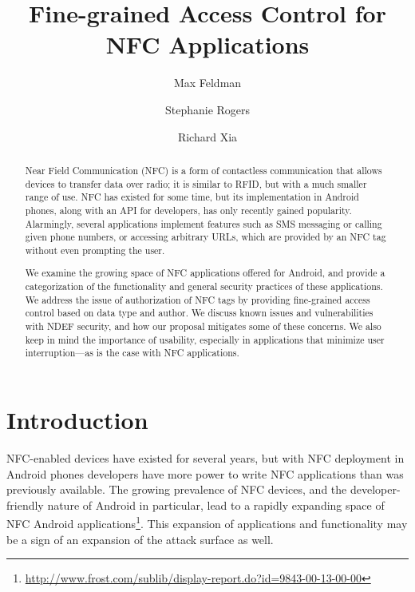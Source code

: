 \documentclass[12pt]{article}
\begin{document}
\title{Fine-grained Access Control for NFC Applications}
\author{Max Feldman \and Stephanie Rogers \and Richard Xia}
\maketitle

\begin{abstract}
Near Field Communication (NFC) is a form of contactless communication that allows devices to transfer data over radio; it is similar to RFID, but with a much smaller range of use.
NFC has existed for some time, but its implementation in Android phones, along with an API for developers, has only recently gained popularity.
Alarmingly, several applications implement features such as SMS messaging or calling given phone numbers, or accessing arbitrary URLs, which are provided by an NFC tag without even prompting the user.

We examine the growing space of NFC applications offered for Android, and provide a categorization of the functionality and general security practices of these applications.
We address the issue of authorization of NFC tags by providing fine-grained access control based on data type and author.
We discuss known issues and vulnerabilities with NDEF security, and how our proposal mitigates some of these concerns.
We also keep in mind the importance of usability, especially in applications that minimize user interruption---as is the case with NFC applications.
\end{abstract}


\section{Introduction}
NFC-enabled devices have existed for several years, but with NFC deployment in Android phones developers have more power to write NFC applications than was previously available.
The growing prevalence of NFC devices, and the developer-friendly nature of Android in particular, lead to a rapidly expanding space of NFC Android applications\footnote{\url{http://www.frost.com/sublib/display-report.do?id=9843-00-13-00-00}}.
This expansion of applications and functionality may be a sign of an expansion of the attack surface as well.
\end{document}
